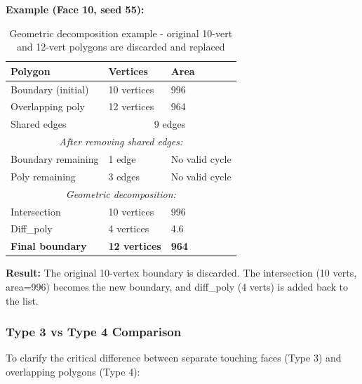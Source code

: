 \documentclass[11pt]{article}
\begin{document}
\textbf{Example (Face 10, seed 55):}

\begin{table}[h]
\centering
\begin{tabular}{|l|l|l|}
\hline
\textbf{Polygon} & \textbf{Vertices} & \textbf{Area} \\ \hline
Boundary (initial) & 10 vertices & 996 \\ \hline
Overlapping poly & 12 vertices & 964 \\ \hline
Shared edges & \multicolumn{2}{c|}{9 edges} \\ \hline
\hline
\multicolumn{3}{|c|}{\textit{After removing shared edges:}} \\ \hline
Boundary remaining & 1 edge & No valid cycle \\ \hline
Poly remaining & 3 edges & No valid cycle \\ \hline
\hline
\multicolumn{3}{|c|}{\textit{Geometric decomposition:}} \\ \hline
Intersection & 10 vertices & 996 \\ \hline
Diff\_poly & 4 vertices & 4.6 \\ \hline
\hline
\textbf{Final boundary} & \textbf{12 vertices} & \textbf{964} \\ \hline
\end{tabular}
\caption{Geometric decomposition example - original 10-vert and 12-vert polygons are discarded and replaced}
\end{table}

\textbf{Result:} The original 10-vertex boundary is discarded. The intersection (10 verts, area=996) becomes the new boundary, and diff\_poly (4 verts) is added back to the list.

\subsubsection{Type 3 vs Type 4 Comparison}

To clarify the critical difference between separate touching faces (Type 3) and overlapping polygons (Type 4):
\end{document}
